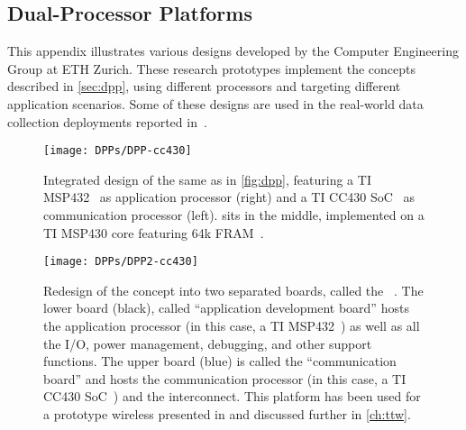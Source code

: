\begin{subappendices}
%

\newpage
\section{Dual-Processor Platforms}
\label{append:dpp}

This appendix illustrates various \DPP designs developed by the Computer Engineering Group at ETH Zurich.
These research prototypes implement the \DPP concepts described in \cref{sec:dpp}, using different processors and targeting different application scenarios. Some of these designs are used in the real-world data collection deployments reported \eg in~\cite{weber2019decade,meyer2019IPSN}.

\vspace{1cm}

\begin{figure}[h]
	\centering
	\texttt{[image: DPPs/DPP-cc430]}
	\caption{Integrated design of the same \DPP as in \cref{fig:dpp}, featuring a TI MSP432~\cite{msp432} as application processor (right) and a TI CC430 SoC~\cite{CC430F6137} as communication processor (left). \bolt sits in the middle, implemented on a TI MSP430 core featuring
64k FRAM~\cite{msp432FR}.}
	\label{fig:dpp-cc430}
\end{figure}

\begin{figure}[!b]
	\centering
	\texttt{[image: DPPs/DPP2-cc430]}
	\caption{Redesign of the \DPP concept into two separated boards, called the \DPPtwo~\cite{beutel2019DPPdemo}. The lower board (black), called ``application development board'' hosts the application processor (in this case, a TI MSP432~\cite{msp432}) as well as all the I/O, power management, debugging, and other support functions. The upper board (blue) is called the ``communication board'' and hosts the communication processor (in this case, a TI CC430 SoC~\cite{CC430F6137}) and the \bolt interconnect.
	This platform has been used for a prototype wireless \CPS presented in \cite{mager2019Feedback, mager2019Demo} and discussed further in \cref{ch:ttw}.}
	\label{fig:dpp2-cc430}
\end{figure}


\end{subappendices}
